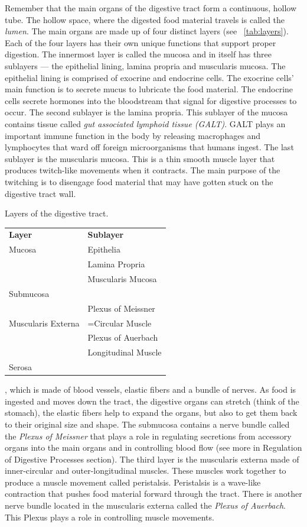 \documentclass{tufte-handout}
\begin{document}
Remember that the main organs of the digestive tract form a continuous, hollow tube. The hollow space, where the digested food material travels is called the \emph{lumen}. The main organs are made up of four distinct layers (see ~\ref{tab:layers}). Each of the four layers has their own unique functions that support proper digestion. The innermost layer is called the mucosa and in itself has three sublayers --- the epithelial lining, lamina propria and muscularis mucosa. The epithelial lining is comprised of exocrine and endocrine cells. The exocrine cells' main function is to secrete mucus to lubricate the food material. The endocrine cells secrete hormones into the bloodstream that signal for digestive processes to occur. The second sublayer is the lamina propria. This sublayer of the mucosa contains tissue called \emph{gut associated lymphoid tissue (GALT)}. GALT plays an important immune function in the body by releasing macrophages and lymphocytes that ward off foreign microorganisms that humans ingest. The last sublayer is the muscularis mucosa. This is a thin smooth muscle layer that produces twitch-like movements when it contracts. The main purpose of the twitching is to disengage food material that may have gotten stuck on the digestive tract wall.

\begin{margintable}
\caption{Layers of the digestive tract.}\label{tab:layers}
\begin{tabular}{ll}
\textbf{Layer} & \textbf{Sublayer} \\
Mucosa & Epithelia \\
       & Lamina Propria \\
       & Muscularis Mucosa \\
Submucosa &  \\
       & Plexus of Meissner \\
Muscularis Externa & =Circular Muscle \\
         & Plexus of Auerbach \\
       & Longitudinal Muscle \\    
Serosa & \\             
\end{tabular}
\end{margintable}

, which is made of blood vessels, elastic fibers and a bundle of nerves. As food is ingested and moves down the tract, the digestive organs can stretch (think of the stomach), the elastic fibers help to expand the organs, but also to get them back to their original size and shape. The submucosa contains a nerve bundle called the \emph{Plexus of Meissner} that plays a role in regulating secretions from accessory organs into the main organs and in controlling blood flow (see more in Regulation of Digestive Processes section). The third layer is the muscularis externa made of inner-circular and outer-longitudinal muscles. These muscles work together to produce a muscle movement called peristalsis. Peristalsis is a wave-like contraction that pushes food material forward through the tract. There is another nerve bundle located in the muscularis externa called the \emph{Plexus of Auerbach}. This Plexus plays a role in controlling muscle movements. 
\end{document}
